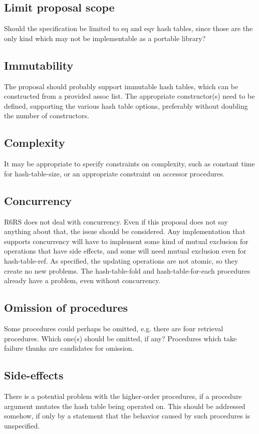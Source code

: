 \documentclass[twoside]{algol60}
\begin{document}
\subsection{Limit proposal scope}
Should the specification be limited to eq and eqv hash tables, since those are the only kind which may not be implementable as a portable library?

\subsection{Immutability}
The proposal should probably support immutable hash tables, which can be constructed from a provided assoc list.  The appropriate constructor(s) need to be defined, supporting the various hash table options, preferably without doubling the number of constructors.

\subsection{Complexity}
It may be appropriate to specify constraints on complexity, such as constant time for hash-table-size, or an appropriate constraint on accessor procedures.

\subsection{Concurrency}
R6RS does not deal with concurrency.  Even if this proposal does not say anything about that, the issue should be considered.  Any implementation that supports concurrency will have to implement some kind of mutual exclusion for operations that have side effects, and some will need mutual exclusion even for {\cf hash-table-ref}.  As specified, the updating operations are not atomic, so they create no new problems.  The {\cf hash-table-fold} and {\cf hash-table-for-each} procedures already have a problem, even without concurrency.

\subsection{Omission of procedures}
Some procedures could perhaps be omitted, e.g. there are four retrieval procedures.  Which one(s) should be omitted, if any?  Procedures which take failure thunks are candidates for omission.

\subsection{Side-effects}
There is a potential problem with the higher-order procedures, if a procedure argument mutates the hash table being operated on.  This should be addressed somehow, if only by a statement that the behavior caused by such procedures is unspecified.
\end{document}
